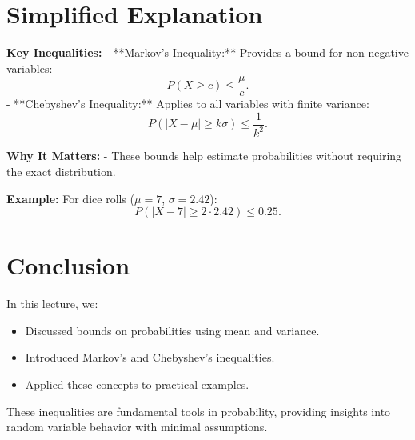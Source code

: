 \documentclass{article}
\begin{document}
\section*{Simplified Explanation}

\textbf{Key Inequalities:}
- **Markov's Inequality:** Provides a bound for non-negative variables:
\[
  P(X \geq c) \leq \frac{\mu}{c}.
\]
- **Chebyshev's Inequality:** Applies to all variables with finite variance:
\[
  P(|X - \mu| \geq k\sigma) \leq \frac{1}{k^2}.
\]

\textbf{Why It Matters:}
- These bounds help estimate probabilities without requiring the exact distribution.

\textbf{Example:}
For dice rolls ($\mu = 7$, $\sigma = 2.42$):
\[
  P(|X - 7| \geq 2 \cdot 2.42) \leq 0.25.
\]

\section*{Conclusion}

In this lecture, we:
\begin{itemize}
  \item Discussed bounds on probabilities using mean and variance.
  \item Introduced Markov's and Chebyshev's inequalities.
  \item Applied these concepts to practical examples.
\end{itemize}

These inequalities are fundamental tools in probability, providing insights into random variable behavior with minimal assumptions.
\end{document}
